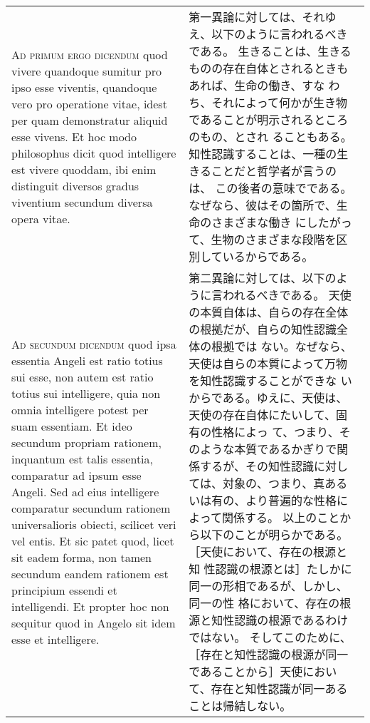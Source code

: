 \documentclass[10pt]{jsarticle} %
\begin{document}
\begin{longtable}{p{21em}p{21em}}
\\



{\scshape Ad primum ergo dicendum} quod vivere quandoque
sumitur pro ipso esse viventis, quandoque vero pro operatione vitae,
idest per quam demonstratur aliquid esse vivens. Et hoc modo philosophus
dicit quod intelligere est vivere quoddam, ibi enim distinguit diversos
gradus viventium secundum diversa opera vitae.


&

第一異論に対しては、それゆえ、以下のように言われるべきである。
生きることは、生きるものの存在自体とされるときもあれば、生命の働き、すな
 わち、それによって何かが生き物であることが明示されるところのもの、とされ
 ることもある。知性認識することは、一種の生きることだと哲学者が言うのは、
 この後者の意味でである。なぜなら、彼はその箇所で、生命のさまざまな働き
 にしたがって、生物のさまざまな段階を区別しているからである。

\\


{\scshape Ad secundum dicendum} quod ipsa essentia
Angeli est ratio totius sui esse, non autem est ratio totius sui
intelligere, quia non omnia intelligere potest per suam essentiam. Et
ideo secundum propriam rationem, inquantum est talis essentia,
comparatur ad ipsum esse Angeli. Sed ad eius intelligere comparatur
secundum rationem universalioris obiecti, scilicet veri vel entis. Et
sic patet quod, licet sit eadem forma, non tamen secundum eandem
rationem est principium essendi et intelligendi. Et propter hoc non
sequitur quod in Angelo sit idem esse et intelligere.


&

第二異論に対しては、以下のように言われるべきである。
天使の本質自体は、自らの存在全体の根拠だが、自らの知性認識全体の根拠では
 ない。なぜなら、天使は自らの本質によって万物を知性認識することができな
 いからである。ゆえに、天使は、天使の存在自体にたいして、固有の性格によっ
 て、つまり、そのような本質であるかぎりで関係するが、その知性認識に対し
 ては、対象の、つまり、真あるいは有の、より普遍的な性格によって関係する。
 以上のことから以下のことが明らかである。［天使において、存在の根源と知
 性認識の根源とは］たしかに同一の形相であるが、しかし、同一の性
 格において、存在の根源と知性認識の根源であるわけではない。
そしてこのために、［存在と知性認識の根源が同一であることから］天使におい
 て、存在と知性認識が同一あることは帰結しない。




\end{longtable}
\newpage
\end{document}
